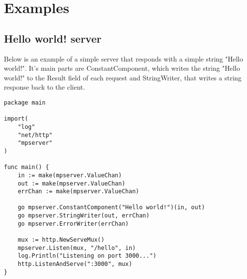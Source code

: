 \documentclass[12pt,a4paper]{article}
\begin{document}
\section{Examples}
\subsection{Hello world! server}
Below is an example of a simple server that responds with a
simple string "Hello world!". It's main parts are ConstantComponent,
which writes the string "Hello world!" to the Result field of each request and 
StringWriter, that writes a string response back to the client. 

\begin{lstlisting}
package main

import(
    "log"
    "net/http"
    "mpserver"
)

func main() {
    in := make(mpserver.ValueChan)
    out := make(mpserver.ValueChan)
    errChan := make(mpserver.ValueChan)

    go mpserver.ConstantComponent("Hello world!")(in, out)
    go mpserver.StringWriter(out, errChan)
    go mpserver.ErrorWriter(errChan)

    mux := http.NewServeMux()
    mpserver.Listen(mux, "/hello", in)
    log.Println("Listening on port 3000...")
    http.ListenAndServe(":3000", mux)
}
\end{lstlisting}
\end{document}
